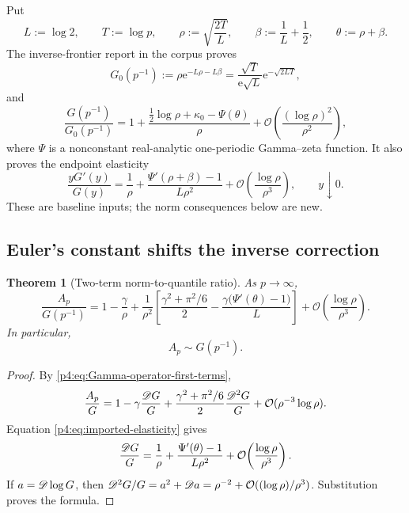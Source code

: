\documentclass[11pt,oneside]{article}
\newtheorem{theorem}{Theorem}[section]
\theoremstyle{definition}
\theoremstyle{remark}
\newcommand{\e}{\mathrm e}
\newcommand{\bigO}{\mathcal O}
\begin{document}
Put
\begin{equation}
 L:=\log2,
 \qquad T:=\log p,
 \qquad
 \rho:=\sqrt{\frac{2T}{L}},
 \qquad
 \beta:=\frac1L+\frac12,
 \qquad
 \theta:=\rho+\beta.
 \label{p4:eq:rho-beta-theta}
\end{equation}
The inverse-frontier report in the corpus proves
\begin{equation}
 G_0(p^{-1})
 :=\rho\e^{-L\rho-L\beta}
 =\frac{\sqrt T}{\e\sqrt L}\e^{-\sqrt{2LT}},
 \label{p4:eq:G0-p}
\end{equation}
and
\begin{equation}
 \frac{G(p^{-1})}{G_0(p^{-1})}
 =1+\frac{\frac12\log\rho+\kappa_0-\Psi(\theta)}{\rho}
 +\bigO\!\left(\frac{(\log\rho)^2}{\rho^2}\right),
 \label{p4:eq:imported-G-expansion}
\end{equation}
where $\Psi$ is a nonconstant real-analytic one-periodic Gamma--zeta function.  It also proves
the endpoint elasticity
\begin{equation}
 \frac{yG'(y)}{G(y)}
 =\frac1\rho+\frac{\Psi'(\rho+\beta)-1}{L\rho^2}
 +\bigO\!\left(\frac{\log\rho}{\rho^3}\right),
 \qquad y\downarrow0.
 \label{p4:eq:imported-elasticity}
\end{equation}
These are baseline inputs; the norm consequences below are new.

\subsection{Euler's constant shifts the inverse correction}

\begin{theorem}[Two-term norm-to-quantile ratio]
\label{p4:thm:norm-quantile-ratio}
As $p\to\infty$,
\begin{equation}
 \boxed{
 \frac{A_p}{G(p^{-1})}
 =1-\frac{\gamma}{\rho}
 +\frac{1}{\rho^2}
 \left[
 \frac{\gamma^2+\pi^2/6}{2}
 -\frac{\gamma\bigl(\Psi'(\theta)-1\bigr)}{L}
 \right]
 +\bigO\!\left(\frac{\log\rho}{\rho^3}\right).}
 \label{p4:eq:norm-quantile-two-term}
\end{equation}
In particular,
\begin{equation}
 \boxed{A_p\sim G(p^{-1}).}
 \label{p4:eq:Ap-G-equivalent}
\end{equation}
\end{theorem}

\begin{proof}
By \eqref{p4:eq:Gamma-operator-first-terms},
\[
 \frac{A_p}{G}
 =1-\gamma\frac{\Dop G}{G}
 +\frac{\gamma^2+\pi^2/6}{2}\frac{\Dop^2G}{G}
 +\bigO(\rho^{-3}\log\rho).
\]
Equation \eqref{p4:eq:imported-elasticity} gives
\[
 \frac{\Dop G}{G}
 =\frac1\rho+\frac{\Psi'(\theta)-1}{L\rho^2}
 +\bigO\!\left(\frac{\log\rho}{\rho^3}\right).
\]
If $a=\mathscr D\log G$, then
$\Dop^2G/G=a^2+\Dop a=\rho^{-2}+\bigO((\log\rho)/\rho^3)$.
Substitution proves the formula.
\end{proof}
\end{document}
